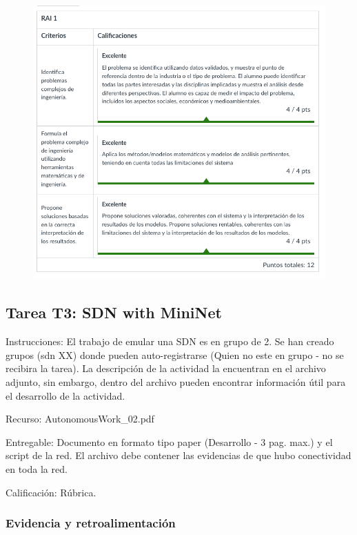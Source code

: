\begin{figure}[htbp]
    \centering
    \includegraphics[width=\textwidth]{recursos/t2ru.png}
\end{figure}

\subsection{Tarea T3: SDN with MiniNet}
Instrucciones: El trabajo de emular una SDN es en grupo de 2. Se han creado grupos (sdn XX) donde pueden auto-registrarse (Quien no este en grupo - no se recibira la tarea). La descripción de la actividad la encuentran en el archivo  adjunto, sin embargo, dentro del archivo pueden encontrar información útil para el desarrollo de la actividad.

Recurso: AutonomousWork\_02.pdf

Entregable: Documento en formato tipo paper (Desarrollo - 3 pag. max.)  y el script de la red. El archivo debe contener las evidencias de que hubo conectividad en toda la red. 

Calificación: Rúbrica. 

\subsubsection{Evidencia y retroalimentación}


